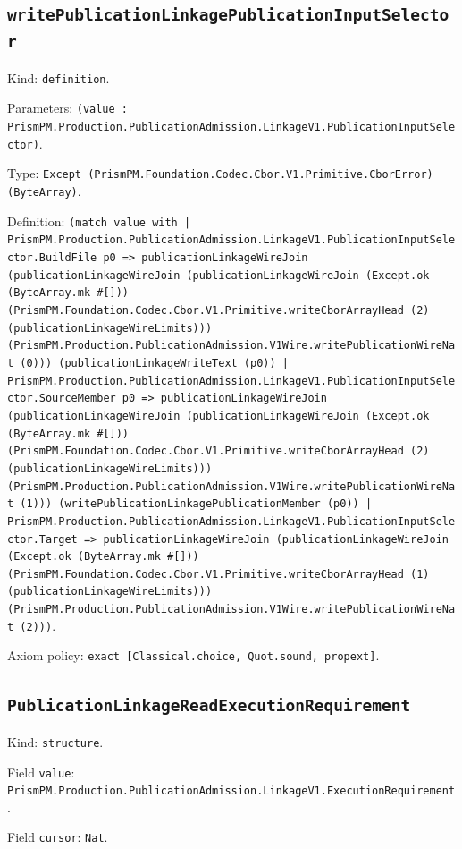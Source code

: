\documentclass[11pt]{article}
\begin{document}
\subsection*{\texttt{writePublicationLinkagePublicationInputSelector}}
\noindent Kind: \texttt{definition}.\par
\noindent Parameters: \texttt{(value : PrismPM.Production.PublicationAdmission.LinkageV1.PublicationInputSelector)}.\par
\noindent Type: \texttt{Except (PrismPM.Foundation.Codec.Cbor.V1.Primitive.CborError) (ByteArray)}.\par
\noindent Definition: \texttt{(match value with | PrismPM.Production.PublicationAdmission.LinkageV1.PublicationInputSelector.BuildFile p0 => publicationLinkageWireJoin (publicationLinkageWireJoin (publicationLinkageWireJoin (Except.ok (ByteArray.mk \#[])) (PrismPM.Foundation.Codec.Cbor.V1.Primitive.writeCborArrayHead (2) (publicationLinkageWireLimits))) (PrismPM.Production.PublicationAdmission.V1Wire.writePublicationWireNat (0))) (publicationLinkageWriteText (p0)) | PrismPM.Production.PublicationAdmission.LinkageV1.PublicationInputSelector.SourceMember p0 => publicationLinkageWireJoin (publicationLinkageWireJoin (publicationLinkageWireJoin (Except.ok (ByteArray.mk \#[])) (PrismPM.Foundation.Codec.Cbor.V1.Primitive.writeCborArrayHead (2) (publicationLinkageWireLimits))) (PrismPM.Production.PublicationAdmission.V1Wire.writePublicationWireNat (1))) (writePublicationLinkagePublicationMember (p0)) | PrismPM.Production.PublicationAdmission.LinkageV1.PublicationInputSelector.Target => publicationLinkageWireJoin (publicationLinkageWireJoin (Except.ok (ByteArray.mk \#[])) (PrismPM.Foundation.Codec.Cbor.V1.Primitive.writeCborArrayHead (1) (publicationLinkageWireLimits))) (PrismPM.Production.PublicationAdmission.V1Wire.writePublicationWireNat (2)))}.\par
\noindent Axiom policy: \texttt{exact [Classical.choice, Quot.sound, propext]}.\par
\subsection*{\texttt{PublicationLinkageReadExecutionRequirement}}
\noindent Kind: \texttt{structure}.\par
\noindent Field \texttt{value}: \texttt{PrismPM.Production.PublicationAdmission.LinkageV1.ExecutionRequirement}.\par
\noindent Field \texttt{cursor}: \texttt{Nat}.\par
\end{document}
